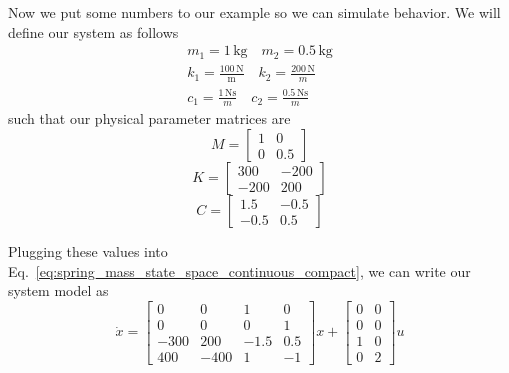 Now we put some numbers to our example so we can simulate behavior. We will define our system as follows
\begin{align}
    m_1 = 1\, \text{kg} \quad m_2 = 0.5\, \text{kg} \\
    k_1 = \frac{100\,\text{N}}{\text{m}} \quad k_2 = \frac{200\,\text{N}}{m} \\
    c_1 = \frac{1\,\text{Ns}}{m} \quad c_2 = \frac{0.5\,\text{Ns}}{m}
\end{align}
such that our physical parameter matrices are
\begin{equation}
    M = 
    \begin{bmatrix}
        1 & 0 \\
        0 & 0.5
    \end{bmatrix}
    \label{eq:mass_matrix_real}
\end{equation}
\begin{equation}
    K =
    \begin{bmatrix}
        300 & -200 \\
        -200 & 200
    \end{bmatrix}
    \label{eq:stiffness_matrix_real}
\end{equation}
\begin{equation}
    C = 
    \begin{bmatrix}
        1.5 & -0.5 \\
        -0.5 & 0.5
    \end{bmatrix}
    \label{eq:dampning_matrix_real}
\end{equation}

Plugging these values into Eq.~\ref{eq:spring_mass_state_space_continuous_compact}, we can write our system model as
\begin{equation} 
    \dot x =
    \begin{bmatrix}
        0 & 0 & 1 & 0 \\
        0 & 0 & 0 & 1 \\
        -300 & 200 & -1.5 & 0.5 \\
        400 & -400 & 1 & -1
    \end{bmatrix}
    x +
    \begin{bmatrix}
        0 & 0 \\
        0 & 0 \\
        1 & 0 \\
        0 & 2
    \end{bmatrix}
    u
    \label{eq:spring_mass_state_space_continuous_real}
\end{equation}

